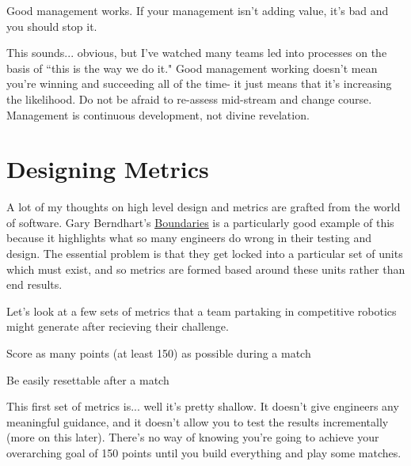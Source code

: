 \begin{theorem}
	Good management works. If your management isn't adding value, it's bad and you should stop it.
\end{theorem}

This sounds... obvious, but I've watched many teams led into processes on the basis of ``this is the way we do it." Good management working doesn't mean you're winning and succeeding all of the time- it just means that it's increasing the likelihood. Do not be afraid to re-assess mid-stream and change course. Management is continuous development, not divine revelation.

\section{Designing Metrics}

A lot of my thoughts on high level design and metrics are grafted from the world of software. Gary Berndhart's \href{https://www.destroyallsoftware.com/talks/boundaries}{\color{red}\underline{Boundaries}} is a particularly good example of this because it highlights what so many engineers do wrong in their testing and design. The essential problem is that they get locked into a particular set of units which must exist, and so metrics are formed based around these units rather than end results.


Let's look at a few sets of metrics that a team partaking in competitive robotics might generate after recieving their challenge.

\begin{asparaenum}[1)]
	\item Score as many points (at least 150) as possible during a match
	\item Be easily resettable after a match
\end{asparaenum}

This first set of metrics is... well it's pretty shallow. It doesn't give engineers any meaningful guidance, and it doesn't allow you to test the results incrementally (more on this later). There's no way of knowing you're going to achieve your overarching goal of 150 points until you build everything and play some matches.

